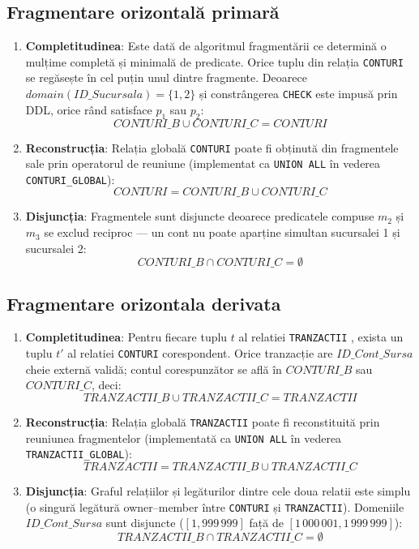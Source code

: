 \documentclass[12pt,a4paper]{article}
\begin{document}
\subsection{Fragmentare orizontală primară}

\begin{enumerate}
  \item \textbf{Completitudinea}: Este dată de algoritmul fragmentării ce determină o mulțime completă și minimală de predicate. Orice tuplu din relația \texttt{CONTURI} se regăsește în cel puțin unul dintre fragmente. Deoarece $domain(ID\_Sucursala) = \{1, 2\}$ și constrângerea \texttt{CHECK} este impusă prin DDL, orice rând satisface $p_1$ sau $p_2$:
  \[ CONTURI\_B \cup CONTURI\_C = CONTURI \]
  \item \textbf{Reconstrucția}: Relația globală \texttt{CONTURI} poate fi obținută din fragmentele sale prin operatorul de reuniune (implementat ca \texttt{UNION ALL} în vederea \texttt{CONTURI\_GLOBAL}):
  \[ CONTURI = CONTURI\_B \cup CONTURI\_C \]
  \item \textbf{Disjuncția}: Fragmentele sunt disjuncte deoarece predicatele compuse $m_2$ și $m_3$ se exclud reciproc — un cont nu poate aparține simultan sucursalei 1 și sucursalei 2:
  \[ CONTURI\_B \cap CONTURI\_C = \emptyset \]
\end{enumerate}

\subsection{Fragmentare orizontala derivata}

\begin{enumerate}
  \item \textbf{Completitudinea}: Pentru fiecare tuplu $t$ al relatiei \texttt{TRANZACTII} , exista un tuplu $t'$ al relatiei \texttt{CONTURI} corespondent. Orice tranzacție are $ID\_Cont\_Sursa$ cheie externă validă; contul corespunzător se află în $CONTURI\_B$ sau $CONTURI\_C$, deci:
  \[ TRANZACTII\_B \cup TRANZACTII\_C = TRANZACTII \]
  \item \textbf{Reconstrucția}: Relația globală \texttt{TRANZACTII} poate fi reconstituită prin reuniunea fragmentelor (implementată ca \texttt{UNION ALL} în vederea \texttt{TRANZACTII\_GLOBAL}):
  \[ TRANZACTII = TRANZACTII\_B \cup TRANZACTII\_C \]
  \item \textbf{Disjuncția}: Graful relațiilor și legăturilor dintre cele doua relatii este simplu (o singură legătură owner--member între \texttt{CONTURI} și \texttt{TRANZACTII}). Domeniile $ID\_Cont\_Sursa$ sunt disjuncte ($[1, 999\,999]$ față de $[1\,000\,001, 1\,999\,999]$):
  \[ TRANZACTII\_B \cap TRANZACTII\_C = \emptyset \]
\end{enumerate}
\end{document}
